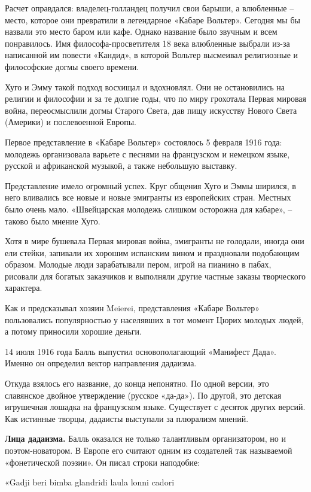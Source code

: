 Расчет оправдался: владелец-голландец получил свои барыши, а влюбленные – место, которое они превратили в легендарное «Кабаре Вольтер». Сегодня мы бы назвали это место баром или кафе. Однако название было звучным и всем понравилось. Имя философа-просветителя 18 века влюбленные выбрали из-за написанной им повести «Кандид», в которой Вольтер высмеивал религиозные и философские догмы своего времени.

Хуго и Эмму такой подход восхищал и вдохновлял. Они не остановились на религии и философии и за те долгие годы, что по миру грохотала Первая мировая война, переосмыслили догмы Старого Света, дав пищу искусству Нового Света (Америки) и послевоенной Европы.

Первое представление в «Кабаре Вольтер» состоялось 5 февраля 1916 года: молодежь организовала варьете с песнями на французском и немецком языке, русской и африканской музыкой, а также небольшую выставку.

Представление имело огромный успех. Круг общения Хуго и Эммы ширился, в него вливались все новые и новые эмигранты из европейских стран. Местных было очень мало. «Швейцарская молодежь слишком осторожна для кабаре», – таково было мнение Хуго.

Хотя в мире бушевала Первая мировая война, эмигранты не голодали, иногда они ели стейки, запивали их хорошим испанским вином и праздновали подобающим образом. Молодые люди зарабатывали пером, игрой на пианино в пабах, рисовали для богатых заказчиков и выполняли другие частные заказы творческого характера.

Как и предсказывал хозяин Meierei, представления «Кабаре Вольтер» пользовались популярностью у населявших в тот момент Цюрих молодых людей, а потому приносили хорошие деньги.

14 июля 1916 года Балль выпустил основополагающий «Манифест Дада». Именно он определил вектор направления дадаизма.

Откуда взялось его название, до конца непонятно. По одной версии, это славянское двойное утверждение (русское «да-да»). По другой, это детская игрушечная лошадка на французском языке. Существует с десяток других версий. Как истинные творцы, дадаисты выступали за плюрализм мнений.

\textbf{Лица дадаизма.} Балль оказался не только талантливым организатором, но и поэтом-новатором. В Европе его считают одним из создателей так называемой «фонетической поэзии». Он писал строки наподобие:

«Gadji beri bimba glandridi laula lonni cadori


